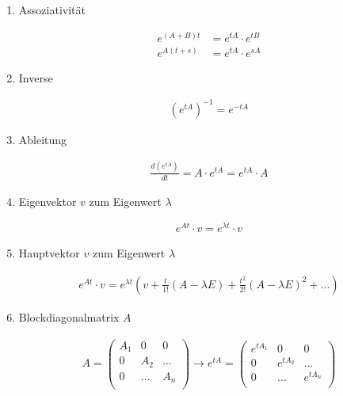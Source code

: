 \documentclass[10pt,a4paper]{article}
\begin{document}
\begin{enumerate}
    \item Assoziativität
  \begin{mdframed}[style=exercise]
    \begin{align}
        e^{(A+B)t} &= e^{tA} \cdot e^{tB}\\
        e^{A(t+s)} &= e^{tA} \cdot e^{sA}
    \end{align}
  \end{mdframed}

    \item Inverse
  \begin{mdframed}[style=exercise]
    \begin{align}
        (e^{tA})^{-1} = e^{-tA}
    \end{align}
  \end{mdframed}

    \item Ableitung
  \begin{mdframed}[style=exercise]
    \begin{align}
        \frac{d(e^{tA})}{dt} = A \cdot e^{tA} =e^{tA} \cdot A
    \end{align}
  \end{mdframed}

    \item Eigenvektor $v$ zum Eigenwert $\lambda$
  \begin{mdframed}[style=exercise]
    \begin{align}
        e^{At} \cdot v = e^{\lambda t} \cdot v
    \end{align}
  \end{mdframed}

    \item Hauptvektor $v$ zum Eigenwert $\lambda$
  \begin{mdframed}[style=exercise]
    \begin{align}
        e^{At} \cdot v = e^{\lambda t} (v+\frac{t}{1!}(A-\lambda E )+\frac{t^2}{2!}(A-\lambda E )^2 + ... )
    \end{align}
  \end{mdframed}

    \item Blockdiagonalmatrix $A$ 
  \begin{mdframed}[style=exercise]
    \begin{align}
     A=   \begin{pmatrix}
             A_1& 0  & 0\\
             0 & A_2 & ... \\
             0 & ... & A_n \\
        \end{pmatrix} \rightarrow 
        e^{tA} =   \begin{pmatrix}
            e^{tA_1}& 0  & 0\\
             0 & e^{tA_2} & ... \\
             0 & ... & e^{tA_n} \\
        \end{pmatrix}
    \end{align}
  \end{mdframed}

\end{enumerate}
\end{document}
